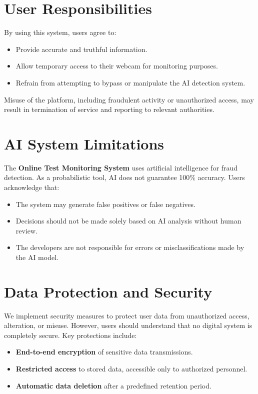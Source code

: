 \documentclass[a4paper,12pt]{article}
\begin{document}
\section{User Responsibilities}
By using this system, users agree to:
\begin{itemize}
    \item Provide accurate and truthful information.
    \item Allow temporary access to their webcam for monitoring purposes.
    \item Refrain from attempting to bypass or manipulate the AI detection system.
\end{itemize}

Misuse of the platform, including fraudulent activity or unauthorized access, may result in termination of service and reporting to relevant authorities.

\section{AI System Limitations}
The \textbf{Online Test Monitoring System} uses artificial intelligence for fraud detection. As a probabilistic tool, AI does not guarantee 100\% accuracy. Users acknowledge that:
\begin{itemize}
    \item The system may generate false positives or false negatives.
    \item Decisions should not be made solely based on AI analysis without human review.
    \item The developers are not responsible for errors or misclassifications made by the AI model.
\end{itemize}

\section{Data Protection and Security}
We implement security measures to protect user data from unauthorized access, alteration, or misuse. However, users should understand that no digital system is completely secure. Key protections include:
\begin{itemize}
    \item \textbf{End-to-end encryption} of sensitive data transmissions.
    \item \textbf{Restricted access} to stored data, accessible only to authorized personnel.
    \item \textbf{Automatic data deletion} after a predefined retention period.
\end{itemize}
\end{document}

